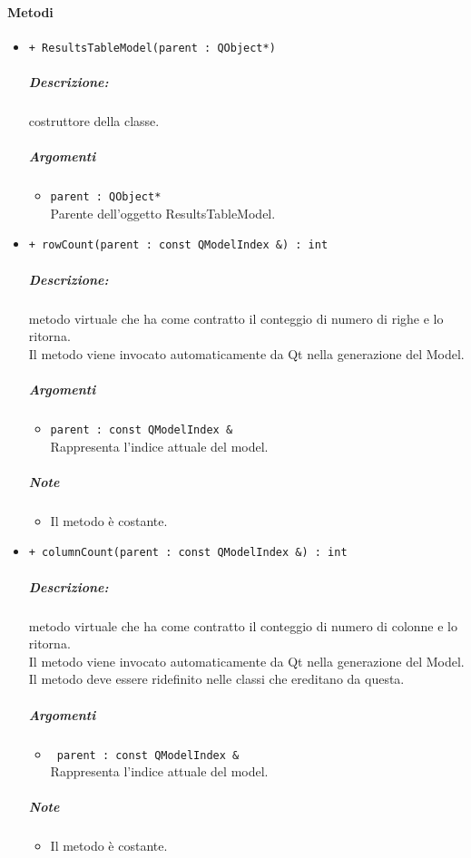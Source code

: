 {\paragraph{\color{black}Metodi\\}
\begin{itemize}
	\item \color{blue}\verb!+ ResultsTableModel(parent : QObject*)!\\
		\color{black}
		\subparagraph{Descrizione:} costruttore della classe.\\
		\subparagraph{Argomenti}
			\begin{itemize}
				\item \color{RoyalPurple}\verb!parent : QObject*!\\
				\color{Black}Parente dell'oggetto ResultsTableModel.
			\end{itemize}
			
	\item \color{blue}\verb!+ rowCount(parent : const QModelIndex &) : int!\\
	\color{black}
	\subparagraph{Descrizione:} metodo virtuale che ha come contratto il conteggio di numero di righe e lo ritorna.
	\\Il metodo viene invocato automaticamente da Qt\g{} nella generazione del Model.\\
	\subparagraph{Argomenti}
		\begin{itemize}
			\item \color{RoyalPurple}\verb!parent : const QModelIndex &!\\
			\color{Black}Rappresenta l'indice attuale del model.
		\end{itemize}
	\subparagraph{Note}
			\begin{itemize}
				\item Il metodo è costante.
			\end{itemize}
	
	\item \color{blue}\verb!+ columnCount(parent : const QModelIndex &) : int!\\
	\color{black}
	\subparagraph{Descrizione:} metodo virtuale che ha come contratto il conteggio di numero di colonne e lo ritorna.\\
	Il metodo viene invocato automaticamente da Qt\g{} nella generazione del Model.\\
	Il metodo deve essere ridefinito nelle classi che ereditano da questa.\\
	\subparagraph{Argomenti}
		\begin{itemize}
			\item \color{RoyalPurple}\verb! parent : const QModelIndex &!\\
			\color{black}Rappresenta l'indice attuale del model.
		\end{itemize}
	\subparagraph{Note}
			\begin{itemize}
				\item Il metodo è costante.
			\end{itemize}
		

\end{itemize}}
